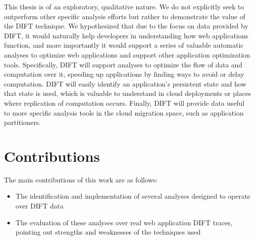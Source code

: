 \documentclass[msc,oneside]{ubcthesis}
\begin{document}
This thesis is of an exploratory, qualitative nature. We do not explicitly seek to outperform other specific analysis efforts but rather to demonstrate the value of the DIFT technique. We hypothesized that due to the focus on data provided by DIFT, it would naturally help developers in understanding how web applications function, and more importantly it would support a series of valuable automatic analyses to optimize web applications and support other application optimization tools. Specifically, DIFT will support analyses to optimize the flow of data and computation over it, speeding up applications by finding ways to avoid or delay computation. DIFT will easily identify an application's persistent state and how that state is used, which is valuable to understand in cloud deployments or places where replication of computation occurs. Finally, DIFT will provide data useful to more specific analysis tools in the cloud migration space, such as application partitioners.
	
	

\section{Contributions}
	
The main contributions of this work are as follows: 
\begin{itemize}
\item The identification and implementation of several analyses designed to operate over DIFT data
\item The evaluation of these analyses over real web application DIFT traces, pointing out strengths and weaknesses of the techniques used
\end{itemize}
\end{document}
